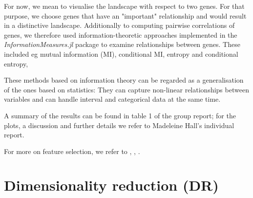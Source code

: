 \documentclass[journal, a4paper]{IEEEtran}
\begin{document}
For now, we mean to visualise the landscape with respect to two genes. For that purpose, we choose genes that have an "important" relationship and would result in a distinctive landscape. 
Additionally to computing pairwise correlations of genes, we therefore used information-theoretic approaches implemented in the \textit{InformationMeasures.jl} package to examine relationships between genes. These included eg mutual information (MI), conditional MI,  entropy and conditional entropy,%

These methods based on information theory can be regarded as a generalisation of the ones based on statistics: They can capture non-linear relationships between variables and can handle interval and categorical data at the same time. %

A summary of the results can be found in table 1 of the group report; for the plots, a discussion and further details we refer to Madeleine Hall's individual report.

For more on feature selection, we refer to \cite{featurelection1}, \cite{featureselection2}, \cite{featureselection3}.



\section{Dimensionality reduction (DR)}

\end{document}
